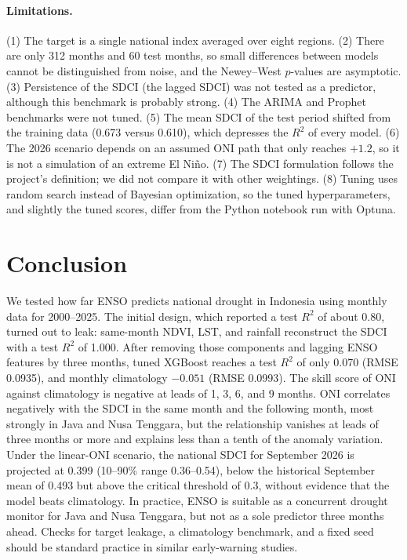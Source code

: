 \documentclass[11pt,twoside]{article}
\begin{document}
\paragraph{Limitations.} (1) The target is a single national index averaged over eight regions. (2) There are only 312 months and 60 test months, so small differences between models cannot be distinguished from noise, and the Newey--West $p$-values are asymptotic. (3) Persistence of the SDCI (the lagged SDCI) was not tested as a predictor, although this benchmark is probably strong. (4) The ARIMA and Prophet benchmarks were not tuned. (5) The mean SDCI of the test period shifted from the training data (0.673 versus 0.610), which depresses the $R^2$ of every model. (6) The 2026 scenario depends on an assumed ONI path that only reaches $+1.2$, so it is not a simulation of an extreme El Ni\~no. (7) The SDCI formulation follows the project's definition; we did not compare it with other weightings. (8) Tuning uses random search instead of Bayesian optimization, so the tuned hyperparameters, and slightly the tuned scores, differ from the Python notebook run with Optuna.

\section{Conclusion}
\label{Sec:Conclusion}

We tested how far ENSO predicts national drought in Indonesia using monthly data for 2000--2025. The initial design, which reported a test $R^2$ of about 0.80, turned out to leak: same-month NDVI, LST, and rainfall reconstruct the SDCI with a test $R^2$ of 1.000. After removing those components and lagging ENSO features by three months, tuned XGBoost reaches a test $R^2$ of only 0.070 (RMSE 0.0935), and monthly climatology $-0.051$ (RMSE 0.0993). The skill score of ONI against climatology is negative at leads of 1, 3, 6, and 9 months. ONI correlates negatively with the SDCI in the same month and the following month, most strongly in Java and Nusa Tenggara, but the relationship vanishes at leads of three months or more and explains less than a tenth of the anomaly variation. Under the linear-ONI scenario, the national SDCI for September 2026 is projected at 0.399 (10--90\% range 0.36--0.54), below the historical September mean of 0.493 but above the critical threshold of 0.3, without evidence that the model beats climatology. In practice, ENSO is suitable as a concurrent drought monitor for Java and Nusa Tenggara, but not as a sole predictor three months ahead. Checks for target leakage, a climatology benchmark, and a fixed seed should be standard practice in similar early-warning studies.
\end{document}
